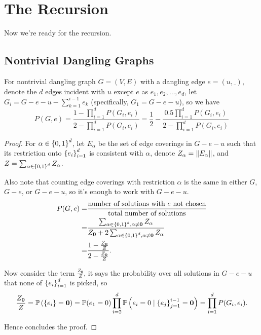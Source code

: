 
\section{The Recursion}


Now we're ready for the recursion.
\subsection{Nontrivial Dangling Graphs}
\begin{Prop}
For nontrivial dangling graph $G=(V,E)$ with a dangling edge $e=(u,\_)$, denote the $d$ %
edges incident with $u$ except $e$ as $e_1, e_2, \ldots, e_d$,
let $G_i = G - e - u - \sum_{k=1}^{i-1} e_k$ (specifically, $G_1 = G - e - u$), so we have%
	\begin{equation}
		P(G, e) = \frac{1-\prod_{i=1}^d P(G_i, e_i)}{2 - \prod_{i=1}^d P(G_i, e_i)} = \frac{1}{2} - \frac{0.5 \prod_{i=1}^d P(G_i, e_i)}{2 - \prod_{i=1}^d P(G_i, e_i)}
		\label{propp3rg}
	\end{equation}
\end{Prop}
\begin{proof}
	For $\alpha \in \left\{0,1\right\}^d$, let $E_{\alpha}$ be the set of edge coverings in $G-e-u$ such that its restriction onto $\left\{e_i\right\}_{i=1}^{d}$ is consistent with $\alpha$, denote $Z_{\alpha} = \left\Vert E_{\alpha}\right\Vert$, and $Z = \sum_{\alpha \in \left\{0,1\right\}^d} Z_{\alpha}$. %

		Also note that counting edge coverings with restriction $\alpha$ is the same in either $G$, $G-e$, or $G-e-u$, so it's enough to work with $G-e-u$.
	\begin{align*}
		P(G,e) = & \frac{\textrm{number of solutions with $e$ not chosen}}{\textrm{total number of solutions}} \\
		=& \frac{\sum_{\alpha \in \left\{0,1\right\}^d, \alpha \neq \mathbf{0}} Z_{\alpha} }{ Z_{\mathbf{0}} + 2 \sum_{\alpha \in \left\{0,1\right\}^d, \alpha \neq \mathbf{0}} Z_{\alpha}} \\
		=& \frac{1 - \frac{Z_{\mathbf{0}}}{Z}}{ 2 - \frac{Z_{\mathbf{0}}}{Z}}.
	\end{align*}

	Now consider the term $\frac{Z_{\mathbf{0}}}{Z}$, it says the probability over all solutions in $G-e-u$ that none of $\left\{e_i\right\}_{i=1}^{d}$ is picked, so
	\begin{align*}
		\frac{Z_{\mathbf{0}}}{Z}=\mathbb{P} \left( \left\{e_i\right\} = \mathbf{0}\right) = \mathbb{P} (e_1 = 0) \prod_{i=2}^d \mathbb{P} \left(e_i = 0 \mid \left\{e_j\right\}_{j=1}^{i-1} = \mathbf{0}\right) = \prod_{i=1}^d P(G_i, e_i).
	\end{align*}

	Hence concludes the proof.
	
\end{proof}

